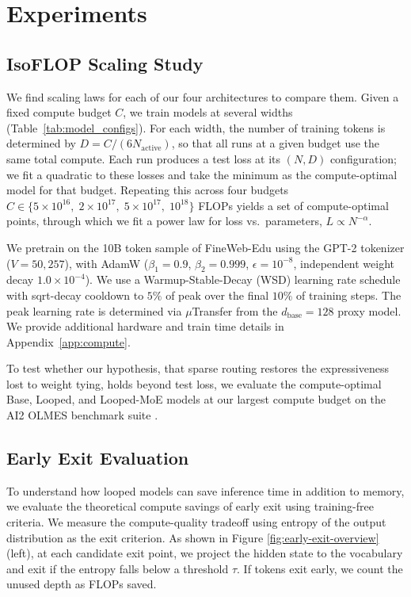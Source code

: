 \documentclass{article}
\begin{document}
\section{Experiments}\label{sec:experiments}

\subsection{IsoFLOP Scaling Study}
We find scaling laws \citep{hoffmann_training_2022} for each of our four architectures to compare them. Given a fixed compute budget $C$, we train models at several widths (Table~\ref{tab:model_configs}). For each width, the number of training tokens is determined by $D = C / (6 N_{\text{active}})$, so that all runs at a given budget use the same total compute. Each run produces a test loss at its $(N, D)$ configuration; we fit a quadratic to these losses and take the minimum as the compute-optimal model for that budget. Repeating this across four budgets $C \in \{5 \times 10^{16},\; 2 \times 10^{17},\; 5 \times 10^{17},\; 10^{18}\}$ FLOPs yields a set of compute-optimal points, through which we fit a power law for loss vs.\ parameters, $L \propto N^{-\alpha}$.

We pretrain on the 10B token sample of FineWeb-Edu \citep{penedo_fineweb_2024} using the GPT-2 tokenizer ($V = 50{,}257$), with AdamW ($\beta_1 = 0.9$, $\beta_2 = 0.999$, $\epsilon = 10^{-8}$, independent weight decay $1.0 \times 10^{-4}$). We use a Warmup-Stable-Decay (WSD) learning rate schedule \citep{hu_minicpm_2024} with sqrt-decay cooldown \citep{dremov_training_2025} to $5\%$ of peak over the final $10\%$ of training steps. The peak learning rate is determined via $\mu$Transfer from the $d_{\text{base}} = 128$ proxy model.  We provide additional hardware and train time details in Appendix~\ref{app:compute}.

To test whether our hypothesis, that sparse routing restores the expressiveness lost to weight tying, holds beyond test loss, we evaluate the compute-optimal Base, Looped, and Looped-MoE models at our largest compute budget on the AI2 OLMES benchmark suite \citep{gu_olmes_2025}.

\subsection{Early Exit Evaluation}\label{subsec:early-exit}
To understand how looped models can save inference time in addition to memory, we evaluate the theoretical compute savings of early exit using training-free criteria. We measure the compute-quality tradeoff using entropy of the output distribution \citep{teerapittayanon_branchynet_2016, xin_deebert_2020} as the exit criterion. As shown in Figure \ref{fig:early-exit-overview} (left), at each candidate exit point, we project the hidden state to the vocabulary and exit if the entropy falls below a threshold $\tau$. If tokens exit early, we count the unused depth as FLOPs saved.
\end{document}
